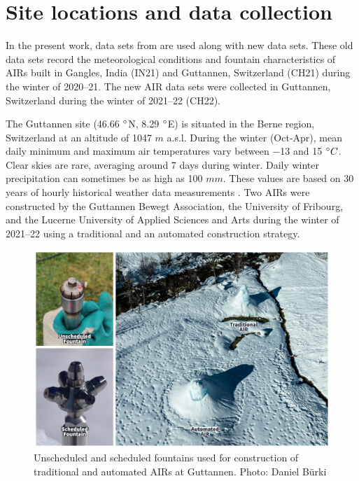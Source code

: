 \documentclass[tc, manuscript]{copernicus}
\begin{document}
\section{Site locations and data collection}

In the present work, data sets from \citet{balasubramanianInfluenceMeteorologicalConditions2022} are used along
with new data sets. These old data sets record the meteorological conditions and fountain characteristics of
AIRs built in Gangles, India (IN21) and Guttannen, Switzerland (CH21) during the winter of 2020--21. The new AIR
data sets were collected in Guttannen, Switzerland during the winter of 2021--22 (CH22).

The Guttannen site (46.66 $^{\circ}$N, 8.29 $^{\circ}$E) is situated in the Berne region, Switzerland at an
altitude of 1047 $m$ a.s.l. During the winter (Oct-Apr), mean daily minimum and maximum air temperatures vary
between $-$13 and 15 $^{\circ} C$. Clear skies are rare, averaging around 7 days during winter. Daily winter
precipitation can sometimes be as high as 100 $mm$. These values are based on 30 years of hourly historical
weather data measurements \citep{meteoblueClimateGuttannen2021}. Two AIRs were constructed by the Guttannen
Bewegt Association, the University of Fribourg, and the Lucerne University of Applied Sciences and Arts during
the winter of 2021--22 using a traditional and an automated construction strategy.

\begin{figure}[htb]
\includegraphics[width=12cm]{Figures/AIR_fountains.jpg}
\caption{Unscheduled and scheduled fountains used for construction of traditional and automated AIRs at
  Guttannen. Photo: Daniel Bürki}
\label{fig:2AIR}
\end{figure}
\end{document}
